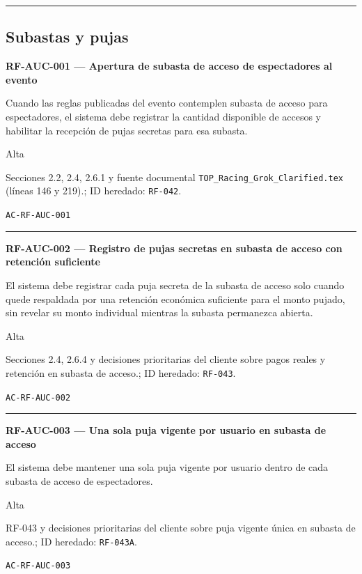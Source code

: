\documentclass[10pt,letterpaper]{article}
\begin{document}
\vspace{0.25em}\hrule\vspace{0.65em}
\subsection{Subastas y pujas}
\noindent\textbf{RF-AUC-001 --- Apertura de subasta de acceso de espectadores al evento}\par
\begin{description}[style=nextline,leftmargin=3.15cm,labelwidth=2.8cm,font=\normalfont\bfseries]
\item[Obligación] Cuando las reglas publicadas del evento contemplen subasta de acceso para espectadores, el sistema debe registrar la cantidad disponible de accesos y habilitar la recepción de pujas secretas para esa subasta.
\item[Prioridad] Alta
\item[Procedencia] Secciones 2.2, 2.4, 2.6.1 y fuente documental \texttt{TOP\_Racing\_Grok\_Clarified.tex} (líneas 146 y 219).; ID heredado: \texttt{RF-042}.
\item[Verificación] \texttt{AC-RF-AUC-001}
\end{description}
\vspace{0.25em}\hrule\vspace{0.65em}
\noindent\textbf{RF-AUC-002 --- Registro de pujas secretas en subasta de acceso con retención suficiente}\par
\begin{description}[style=nextline,leftmargin=3.15cm,labelwidth=2.8cm,font=\normalfont\bfseries]
\item[Obligación] El sistema debe registrar cada puja secreta de la subasta de acceso solo cuando quede respaldada por una retención económica suficiente para el monto pujado, sin revelar su monto individual mientras la subasta permanezca abierta.
\item[Prioridad] Alta
\item[Procedencia] Secciones 2.4, 2.6.4 y decisiones prioritarias del cliente sobre pagos reales y retención en subasta de acceso.; ID heredado: \texttt{RF-043}.
\item[Verificación] \texttt{AC-RF-AUC-002}
\end{description}
\vspace{0.25em}\hrule\vspace{0.65em}
\noindent\textbf{RF-AUC-003 --- Una sola puja vigente por usuario en subasta de acceso}\par
\begin{description}[style=nextline,leftmargin=3.15cm,labelwidth=2.8cm,font=\normalfont\bfseries]
\item[Obligación] El sistema debe mantener una sola puja vigente por usuario dentro de cada subasta de acceso de espectadores.
\item[Prioridad] Alta
\item[Procedencia] RF-043 y decisiones prioritarias del cliente sobre puja vigente única en subasta de acceso.; ID heredado: \texttt{RF-043A}.
\item[Verificación] \texttt{AC-RF-AUC-003}
\end{description}
\end{document}
